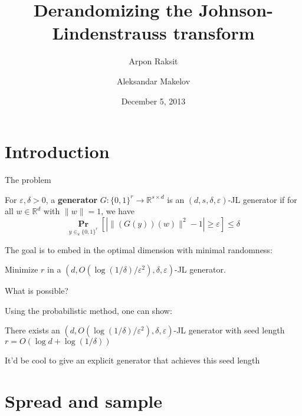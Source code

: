 \documentclass[10pt]{beamer}
\title[Derandomizing JL]{Derandomizing the Johnson-Lindenstrauss
  transform}
\author{Arpon Raksit  \and Aleksandar Makelov}
\date{December 5, 2013}
\newcommand{\R}{\mathbb{R}}
\renewcommand{\P}{\operatorname*{\mathbf{Pr}}}
\renewcommand{\l}{\left}
\renewcommand{\r}{\right}
\newcommand{\eps}{\varepsilon}
\newcommand{\inr}{\in_{u}}
\begin{document}
\begin{frame}
  \titlepage
\end{frame}


\section{Introduction}

\begin{frame}
  \sectionpage
\end{frame}

\begin{frame}{The problem}
  \begin{definition}
    For $\eps,\delta>0$, a \textbf{generator} $G:\{0,1\}^r\to \R^{s\times
      d}$ is an $(d,s,\delta,\eps)$-JL generator if for all $w\in\R^d$
    with $\|w\|=1$, we have
    \[
    \P_{y\inr\{0,1\}^r}\l[| \|(G(y))(w) \|^2 -
      1|\geq\eps\r]\leq\delta
    \]
  \end{definition}

  \pause\bigskip\bigskip

  The goal is to embed in the optimal dimension with minimal
  randomness:

  \begin{problem}
    Minimize $r$ in a $(d,O(\log(1/\delta)/\eps^2),\delta,\eps)$-JL
    generator.
  \end{problem}

\end{frame}

\begin{frame}{What is possible?}

  Using the probabilistic method, one can show:
  \begin{theorem}
    There exists an $(d,O(\log(1/\delta)/\eps^2),\delta,\eps)$-JL
    generator with seed length $r=O(\log d + \log(1/\delta))$
  \end{theorem}

  \bigskip\bigskip

  It'd be cool to give an explicit generator that achieves this seed
  length

\end{frame}



\section{Spread and sample \cite{karnin2011explicit}}
\end{document}
